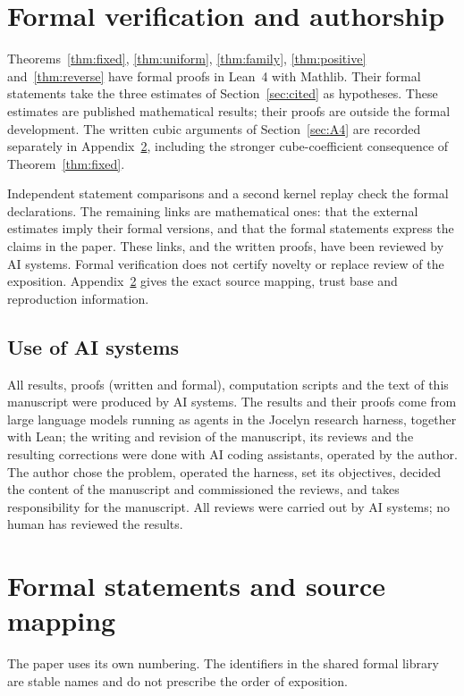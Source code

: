 \documentclass[11pt,reqno]{amsart}
\theoremstyle{definition}
\theoremstyle{remark}
\numberwithin{equation}{section}
\newcommand{\lean}{Lean}
\begin{document}
\section{Formal verification and authorship}\label{sec:status}
Theorems~\ref{thm:fixed}, \ref{thm:uniform}, \ref{thm:family},
\ref{thm:positive} and~\ref{thm:reverse} have formal proofs in \lean~4
with Mathlib. Their formal statements take the three estimates of
Section~\ref{sec:cited} as hypotheses. These estimates are published
mathematical results; their proofs are outside the formal development.
The written cubic arguments of Section~\ref{sec:A4} are recorded separately
in Appendix~\ref{app:lean}, including the stronger cube-coefficient
consequence of Theorem~\ref{thm:fixed}.

Independent statement comparisons and a second kernel replay check the
formal declarations. The remaining links are mathematical ones: that the
external estimates imply their formal versions, and that the formal
statements express the claims in the paper. These links, and the written
proofs, have been reviewed by AI systems. Formal verification does not
certify novelty or replace review of the exposition. Appendix~\ref{app:lean}
gives the exact source mapping, trust base and reproduction information.

\subsection*{Use of AI systems}
All results, proofs (written and formal), computation scripts and the text
of this manuscript were produced by AI systems. The results and their
proofs come from large language models running as agents in the Jocelyn
research harness, together with \lean; the writing and revision of the
manuscript, its reviews and the resulting corrections were done with AI
coding assistants, operated by the author. The author chose the problem,
operated the harness, set its objectives, decided the content of the
manuscript and commissioned the reviews, and takes responsibility for the
manuscript. All reviews were carried out by AI systems; no human has
reviewed the results.

\appendix
\section{Formal statements and source mapping}\label{app:lean}
The paper uses its own numbering. The identifiers in the shared formal
library are stable names and do not prescribe the order of exposition.
\end{document}

